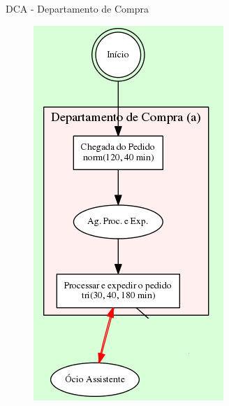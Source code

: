\documentclass[xcolor=dvipsnames]{beamer}
\begin{document}
\begin{frame}{DCA - Departamento de Compra}
	\begin{figure}[H]
		\centering
		\includegraphics[height=0.865\textheight]{img/a.png}
	\end{figure}
\end{frame}
	
\end{document}
